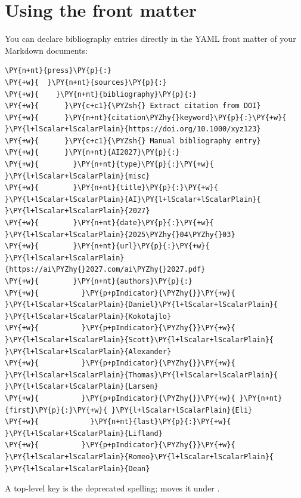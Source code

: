 \documentclass[a4paper,twoside]{article}
\begin{document}
\section{Using the front matter}
You can declare bibliography entries directly in the YAML front matter of your Markdown documents:
\begin{tscode}[lang=yaml, engine=pygments]
\begin{Verbatim}[commandchars=\\\{\},breaklines, breakanywhere, commandchars=\\\{\}]
\PY{n+nt}{press}\PY{p}{:}
\PY{+w}{  }\PY{n+nt}{sources}\PY{p}{:}
\PY{+w}{    }\PY{n+nt}{bibliography}\PY{p}{:}
\PY{+w}{      }\PY{c+c1}{\PYZsh{} Extract citation from DOI}
\PY{+w}{      }\PY{n+nt}{citation\PYZhy{}keyword}\PY{p}{:}\PY{+w}{ }\PY{l+lScalar+lScalarPlain}{https://doi.org/10.1000/xyz123}
\PY{+w}{      }\PY{c+c1}{\PYZsh{} Manual bibliography entry}
\PY{+w}{      }\PY{n+nt}{AI2027}\PY{p}{:}
\PY{+w}{        }\PY{n+nt}{type}\PY{p}{:}\PY{+w}{ }\PY{l+lScalar+lScalarPlain}{misc}
\PY{+w}{        }\PY{n+nt}{title}\PY{p}{:}\PY{+w}{ }\PY{l+lScalar+lScalarPlain}{AI}\PY{l+lScalar+lScalarPlain}{ }\PY{l+lScalar+lScalarPlain}{2027}
\PY{+w}{        }\PY{n+nt}{date}\PY{p}{:}\PY{+w}{ }\PY{l+lScalar+lScalarPlain}{2025\PYZhy{}04\PYZhy{}03}
\PY{+w}{        }\PY{n+nt}{url}\PY{p}{:}\PY{+w}{ }\PY{l+lScalar+lScalarPlain}{https://ai\PYZhy{}2027.com/ai\PYZhy{}2027.pdf}
\PY{+w}{        }\PY{n+nt}{authors}\PY{p}{:}
\PY{+w}{          }\PY{p+pIndicator}{\PYZhy{}}\PY{+w}{ }\PY{l+lScalar+lScalarPlain}{Daniel}\PY{l+lScalar+lScalarPlain}{ }\PY{l+lScalar+lScalarPlain}{Kokotajlo}
\PY{+w}{          }\PY{p+pIndicator}{\PYZhy{}}\PY{+w}{ }\PY{l+lScalar+lScalarPlain}{Scott}\PY{l+lScalar+lScalarPlain}{ }\PY{l+lScalar+lScalarPlain}{Alexander}
\PY{+w}{          }\PY{p+pIndicator}{\PYZhy{}}\PY{+w}{ }\PY{l+lScalar+lScalarPlain}{Thomas}\PY{l+lScalar+lScalarPlain}{ }\PY{l+lScalar+lScalarPlain}{Larsen}
\PY{+w}{          }\PY{p+pIndicator}{\PYZhy{}}\PY{+w}{ }\PY{n+nt}{first}\PY{p}{:}\PY{+w}{ }\PY{l+lScalar+lScalarPlain}{Eli}
\PY{+w}{            }\PY{n+nt}{last}\PY{p}{:}\PY{+w}{ }\PY{l+lScalar+lScalarPlain}{Lifland}
\PY{+w}{          }\PY{p+pIndicator}{\PYZhy{}}\PY{+w}{ }\PY{l+lScalar+lScalarPlain}{Romeo}\PY{l+lScalar+lScalarPlain}{ }\PY{l+lScalar+lScalarPlain}{Dean}
\end{Verbatim}
\end{tscode}
A top-level  key is the deprecated spelling; 
moves it under .
\end{document}
